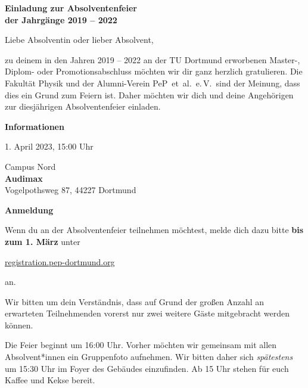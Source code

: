 \documentclass[parskip=half, fontsize=10pt, paper=a5]{scrartcl}
\begin{document}
\raggedright


\begin{center}
\textbf{\Large Einladung zur Absolventenfeier\\ der Jahrgänge 2019 – 2022}
\end{center}
\vspace{0.5cm}

Liebe Absolventin oder lieber Absolvent,

zu deinem in den Jahren 2019 – 2022 an der TU Dortmund erworbenen Master-, Diplom- oder Promotionsabschluss möchten
wir dir ganz herzlich gratulieren.
Die Fakultät Physik und der Alumni-Verein PeP~et~al.~e.\,V.\ sind der Meinung, dass dies ein Grund zum Feiern ist.
Daher möchten wir dich und deine Angehörigen zur diesjährigen Absolventenfeier einladen.

\vspace{0.25cm}
\textcolor{tu}{\textbf{\large Informationen}}
\begin{description}[style=multiline, leftmargin=5em]
  \item[Wann] 1. April 2023, 15:00 Uhr
  \item[Wo] Campus Nord\\
    \textbf{Audimax}\\
    Vogelpothsweg 87, 44227 Dortmund
\end{description}

\vspace{0.25cm}
\textcolor{tu}{\textbf{\large Anmeldung}}

Wenn du an der Absolventenfeier teilnehmen möchtest, melde dich dazu bitte \textbf{bis zum 1. März} unter
\begin{center}
  \large
  \href{https://registration.pep-dortmund.org/events/absol23/registration}{registration.pep-dortmund.org} 
\end{center}
an.

Wir bitten um dein Verständnis, dass auf Grund der großen Anzahl an erwarteten Teilnehmenden vorerst nur zwei weitere
Gäste mitgebracht werden können.

Die Feier beginnt um 16:00 Uhr. Vorher möchten wir gemeinsam mit allen Absolvent*innen ein Gruppenfoto aufnehmen.
Wir bitten daher sich \emph{spätestens} um 15:30 Uhr im Foyer des Gebäudes einzufinden.
Ab 15 Uhr stehen für euch Kaffee und Kekse bereit.
\end{document}
